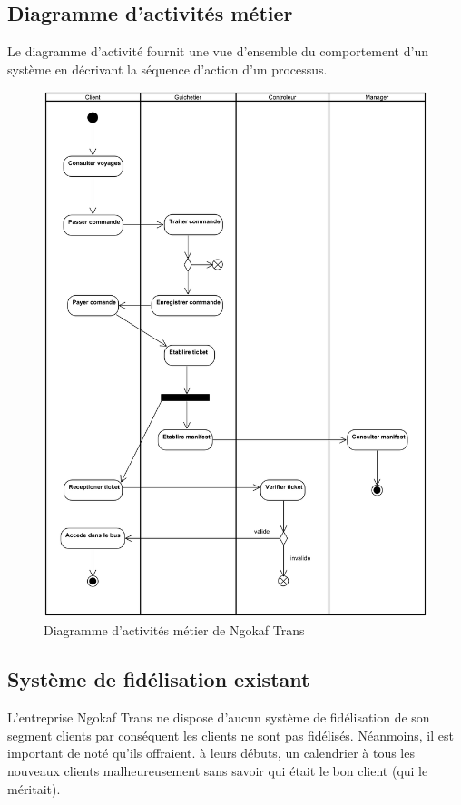         \subsection[Diagramme d’activités métier]{Diagramme d’activités métier}
        Le diagramme d’activité fournit une vue d’ensemble du comportement d’un système en
        décrivant la séquence d’action d’un processus.
        \begin{figure}[H]
            \centering
            \includegraphics[width=140mm]{images/diagrammes-d-activites/metier Activity Diagram.png}
            \caption{Diagramme d’activités métier de Ngokaf Trans}
            \label{fig:DacNgokaf}
        \end{figure}
\pagebreak
        \subsection[Système de fidélisation existant]{Système de fidélisation existant}
        L’entreprise Ngokaf Trans ne dispose d’aucun système de fidélisation de son segment
        clients par conséquent les clients ne sont pas fidélisés. Néanmoins, il est important
        de noté qu’ils offraient. à leurs débuts, un calendrier à tous les nouveaux clients malheureusement
        sans savoir qui était le bon client (qui le méritait).
